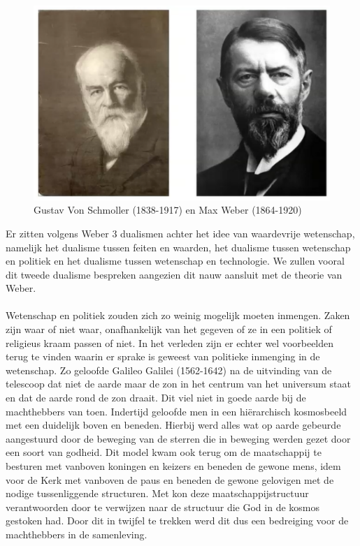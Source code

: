 \documentclass[../summary.tex]{subfiles}
\begin{document}
	\begin{figure} [htbp]
		\centering
		\includegraphics[width=0.75\linewidth]{images/2-von-schmoller-weber.png}
		\caption{Gustav Von Schmoller (1838-1917) en Max Weber (1864-1920)}
		\label{fig:von-schmoller-weber}
	\end{figure}
	
	Er zitten volgens Weber 3 dualismen achter het idee van waardevrije wetenschap, namelijk het dualisme tussen feiten en waarden, het dualisme tussen wetenschap en politiek en het dualisme tussen wetenschap en technologie. We zullen vooral dit tweede dualisme bespreken aangezien dit nauw aansluit met de theorie van Weber.
	\\\\
	Wetenschap en politiek zouden zich zo weinig mogelijk moeten inmengen. Zaken zijn waar of niet waar, onafhankelijk van het gegeven of ze in een politiek of religieus kraam passen of niet. In het verleden zijn er echter wel voorbeelden terug te vinden waarin er sprake is geweest van politieke inmenging in de wetenschap. Zo geloofde Galileo Galilei (1562-1642) na de uitvinding van de telescoop dat niet de aarde maar de zon in het centrum van het universum staat en dat de aarde rond de zon draait. Dit viel niet in goede aarde bij de machthebbers van toen. Indertijd geloofde men in een hiërarchisch kosmosbeeld met een duidelijk boven en beneden. Hierbij werd alles wat  op aarde gebeurde aangestuurd door de beweging van de sterren die in beweging werden gezet door een soort van godheid. Dit model kwam ook terug om de maatschappij te besturen met vanboven koningen en keizers en beneden de gewone mens, idem voor de Kerk met vanboven de paus en beneden de gewone gelovigen met de nodige tussenliggende structuren. Met kon deze maatschappijstructuur verantwoorden door te verwijzen naar de structuur die God in de kosmos gestoken had. Door dit in twijfel te trekken werd dit dus een bedreiging voor de machthebbers in de samenleving. 
	
	
	
\end{document}
